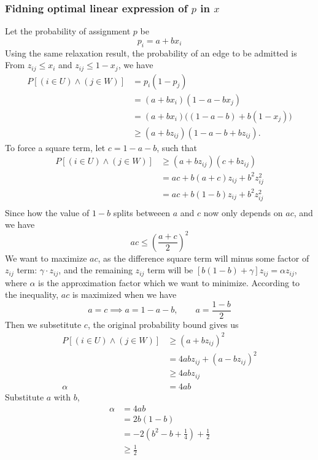 \documentclass[10pt]{article}
\theoremstyle{definition}
\begin{document}
\subsubsection*{Fidning optimal linear expression of $p$ in $x$}
Let the probability of assignment $p$ be 
\[p_i = a + bx_i\]
Using the same relaxation result, the probability of an edge to be admitted is 
From $z_{ij} \leq x_i$ and $z_{ij} \leq 1-x_j$, we have
\begin{align*}
P[(i \in U) \land (j \in W)]
&= p_i(1-p_j)\\
&= (a+bx_i)(1-a-bx_j)\\
&= (a+bx_i)\bigl((1-a-b)+b(1-x_j)\bigr)\\
&\geq (a+bz_{ij})(1-a-b+bz_{ij}).
\end{align*}
To force a square term, let $c = 1 - a - b$, such that 
\begin{align*}
P[(i \in U) \land (j \in W)] &\geq (a + bz_{ij})(c + bz_{ij})  \\
&= ac + b(a+c)z_{ij} + b^2 z_{ij}^2\\
&= ac + b(1-b)z_{ij} + b^2 z_{ij}^2\\
\end{align*}
Since how the value of $1-b$ splits betweeen $a$ and $c$ now only depends on $ac$, and we have
\[ac \leq \left(\frac{a + c}{2}\right)^2\]
We want to maximize $ac$, as the difference square term will minus some factor of $z_{ij}$ term: $\gamma \cdot z_{ij}$, and the remaining $z_{ij}$ term will be
$[b (1 - b) + \gamma ] z_{ij} = \alpha z_{ij}$, where $\alpha$ is the approximation factor which we want to minimize. According to the 
inequality, $ac$ is maximized when we have 
\[a=c \implies a = 1 - a - b, \qquad a = \frac{1-b}{2}\] 
Then we subsetitute $c$, the original probability bound gives us
\begin{align*}
P[(i\in U)\land(j\in W)]
&\geq (a+bz_{ij})^2\\
&= 4abz_{ij} + (a-bz_{ij})^2\\
&\geq 4abz_{ij}\\
\alpha &= 4ab
\end{align*}
Substitute $a$ with $b$, 
\begin{align*}
  \alpha &= 4ab\\
  &= 2b(1-b)\\
  &= -2(b^2 - b + \frac{1}{4}) + \frac{1}{2}\\
  &\geq \frac{1}{2}
\end{align*}
\end{document}
